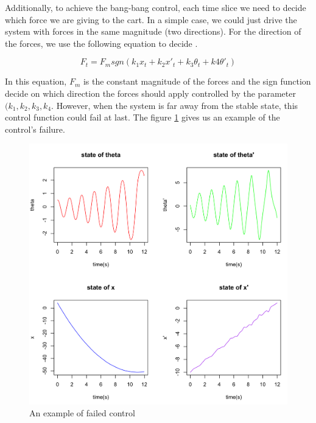 \documentclass[11pt,twoside,a4paper]{article}
\begin{document}
Additionally, to achieve the bang-bang control, each time slice we
need to decide which force we are giving to the cart. In a simple case,
we could just drive the system with forces in the same magnitude (two
directions). For the direction of the forces, we use the following
equation to decide \cite{Brownlee2005}.
\begin{center}
\begin{equation}\label{PH:bangbang}
F_t = F_m sgn (k_1 x_t + k_2 x'_t + k_3 \theta_t + k4 \theta'_t)
\end{equation}
\end{center}

In this equation, $F_m$ is the constant magnitude of the forces and
the sign function decide on which direction the forces should apply
controlled by the parameter $(k_1, k_2, k_3, k_4$. However, when the
system is far away from the stable state, this control function could
fail at last. The figure \ref{fail-control} gives us an example of the
control's failure.\\

\begin{figure}[!]
\begin{center}
\includegraphics[width=14cm]{fail-control.png}
\caption{An example of failed control}
\label{fail-control}
\end{center}
\end{figure}
\end{document}
